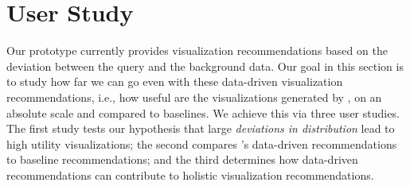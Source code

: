 
\section{User Study}
\label{sec:user_study}

Our \SeeDB prototype currently provides 
visualization recommendations based on the 
deviation between the query and the background data.
Our goal in this section is to study how
far we can go even with these data-driven visualization
recommendations, i.e., how useful are the 
visualizations generated by \SeeDB, on an absolute scale
and compared to baselines. 
We achieve this via three user studies.
The first study tests our hypothesis that large 
{\it deviations in distribution} 
lead to high utility visualizations;
the second compares \SeeDB's data-driven recommendations 
to baseline recommendations; and the third
determines how data-driven 
recommendations can contribute to 
holistic visualization recommendations. 




